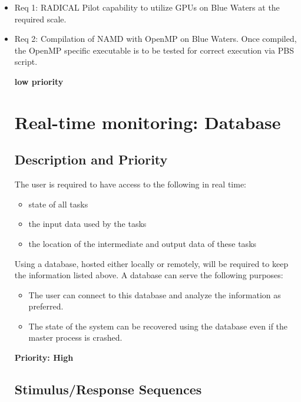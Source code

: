 \documentclass{scrreprt}
\begin{document}
\begin{itemize}[noitemsep]
\item Req 1: RADICAL Pilot capability to utilize GPUs on Blue Waters at the required scale.
\item Req 2: Compilation of NAMD with OpenMP on Blue Waters. Once compiled, the OpenMP specific executable is to be tested for correct execution via PBS script.

\textbf{low priority}

\section{Real-time monitoring: Database}

\subsection{Description and Priority}

The user is required to have access to the following in real time:

\begin{itemize}[noitemsep]
\item state of all tasks
\item the input data used by the tasks
\item the location of the intermediate and output data of these tasks
\end{itemize}

Using a database, hosted either locally or remotely, will be required to keep the information listed above. A database can serve the following purposes:

\begin{itemize}[noitemsep]
\item The user can connect to this database and analyze the information as preferred.
\item The state of the system can be recovered using the database even if the master process is crashed.
\end{itemize}

\textbf{Priority: High}

\subsection{Stimulus/Response Sequences}


\end{itemize}
\end{document}
